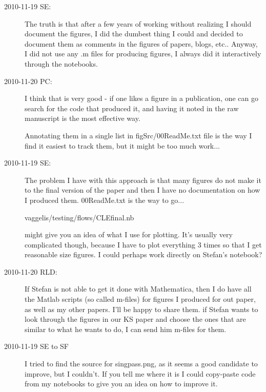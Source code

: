 \begin{description}
\item[2010-11-19 SE:]
The truth is that after a few years of working without realizing I
should document the figures, I did the dumbest thing I could and
decided to document them as comments in the figures of papers, blogs,
etc..
Anyway, I did not use any .m files for producing figures, I always did
it interactively through the notebooks.

\item[2010-11-20 PC:] I think that is very good - if one likes a figure
in a publication, one can go search for the code that produced it, and
having it noted in the raw manuscript is the most effective way.

Annotating them in a single list in figSrc/00ReadMe.txt file is the way I
find it easiest to track them, but it might be too much work...

\item[2010-11-19 SE:]
The problem I have with this approach is that many figures do not make
it to the final version of the paper and then I have no documentation
on how I produced them. 00ReadMe.txt is the way to go...

vaggelis/testing/flows/CLEfinal.nb

might give you an idea of what I use for plotting. It's usually very
complicated though, because I have to plot everything 3 times so that
I get reasonable size figures. I could perhaps work directly on
Stefan's notebook?

\item[2010-11-20 RLD:]
If Stefan is not able to get it done with Mathematica, then I do have all
the Matlab scripts (so called m-files) for figures I produced for out
paper, as well as my other papers.  I'll be happy to share them. if
Stefan wants to look through the figures in our KS paper and choose the
ones that are similar to what he wants to do, I can send him m-files for
them.

\item[2010-11-19 SE to SF]
I tried to find the source for singpass.png, as it seems a good candidate
to improve, but I couldn't. If you tell me where it is I could copy-paste
code from my notebooks to give you an idea on how to improve it.


\end{description}
